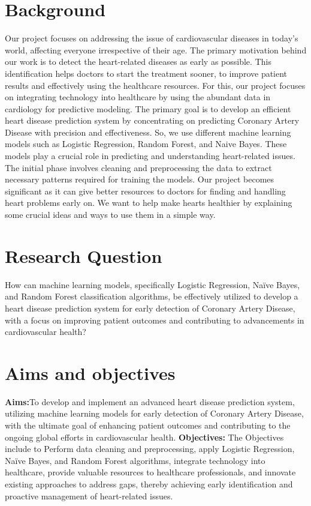 \section{Background}
\label{sec:into_back}
Our project focuses on addressing the issue of cardiovascular diseases in today's world, affecting everyone irrespective of their age. The primary motivation behind our work is to detect the heart-related diseases as early as possible. This identification helps doctors to start the treatment sooner, to improve patient results and effectively using the healthcare resources. For this, our project focuses on integrating technology into healthcare by using the abundant data in cardiology for predictive modeling. The primary goal is to develop an efficient heart disease prediction system by concentrating on predicting Coronary Artery Disease with precision and effectiveness. So, we use different machine learning models such as Logistic Regression, Random Forest, and Naive Bayes. These models play a crucial role in predicting and understanding heart-related issues. The initial phase involves cleaning and preprocessing the data to extract necessary patterns required for training the models. Our project becomes significant as it can give better resources to doctors for finding and handling heart problems early on. We want to help make hearts healthier by explaining some crucial ideas and ways to use them in a simple way.

\section{Research Question}
\label{sec:intro_prob_art}
How can machine learning models, specifically Logistic Regression, Naïve Bayes, and Random Forest classification algorithms, be effectively utilized to develop a heart disease prediction system for early detection of Coronary Artery Disease, with a focus on improving patient outcomes and contributing to advancements in cardiovascular health?

\section{Aims and objectives}
\label{sec:intro_aims_obj}
 

\textbf{Aims:}To develop and implement an advanced heart disease prediction system, utilizing machine learning models for early detection of Coronary Artery Disease, with the ultimate goal of enhancing patient outcomes and contributing to the ongoing global efforts in cardiovascular health.
\textbf{Objectives:} The Objectives include to Perform data cleaning and preprocessing, apply Logistic Regression, Naïve Bayes, and Random Forest algorithms, integrate technology into healthcare, provide valuable resources to healthcare professionals, and innovate existing approaches to address gaps, thereby achieving early identification and proactive management of heart-related issues.



